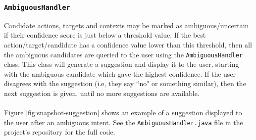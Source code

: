 \documentclass[11pt]{article}
\begin{document}
\subsubsection{\texttt{AmbiguousHandler}}

Candidate actions, targets and contexts may be marked as ambiguous/uncertain if their confidence score is just below a threshold value. If the best action/target/candidate has a confidence value lower than this threshold, then all the ambiguous candidates are queried to the user using the \texttt{AmbiguousHandler} class. This class will generate a suggestion and display it to the user, starting with the ambiguous candidate which gave the highest confidence. If the user disagrees with the suggestion (i.e, they say ``no" or something similar), then the next suggestion is given, until no more suggestions are available.
\\
\\
Figure \ref{fig:snapshot-suggestion} shows an example of a suggestion displayed to the user after an ambiguous intent. See the \texttt{AmbiguousHandler.java} file in the project's repository for the full code.
\end{document}
